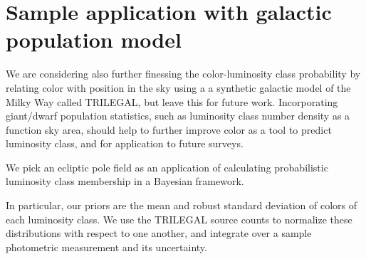 \section{Sample application with galactic population model}

We are considering also further finessing the color-luminosity class probability by relating color with position in the sky using a a synthetic galactic model of the Milky Way called TRILEGAL, but leave this for future work. Incorporating giant/dwarf population statistics, such as luminosity class number density as a function sky area, should help to further improve color as a tool to predict luminosity class, and for application to future surveys.

We pick an ecliptic pole field as an application of calculating probabilistic luminosity class membership in a Bayesian framework.

In particular, our priors are the mean and robust standard deviation of colors of each luminosity class. We use the TRILEGAL source counts to normalize these distributions with respect to one another, and integrate over a sample photometric measurement and its uncertainty.

